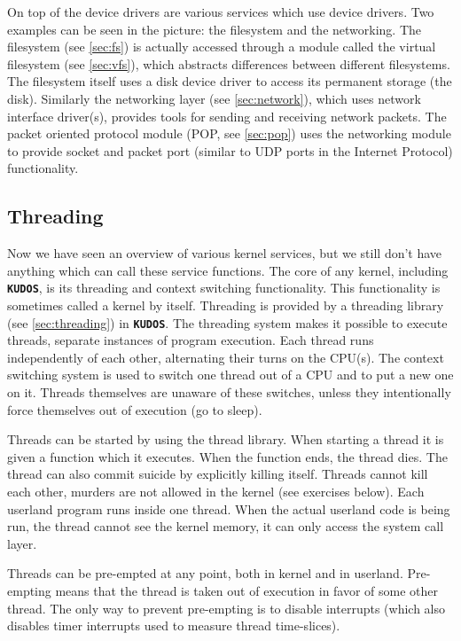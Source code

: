 \documentclass[twoside,a4paper]{report}
\newcommand{\kudos}{\texttt{\textbf{KUDOS}}}
\begin{document}
On top of the device drivers are various services which use device
drivers. Two examples can be seen in the picture: the filesystem and
the networking. The filesystem (see \autoref{sec:fs}) is actually
accessed through a module called the virtual filesystem (see
\autoref{sec:vfs}), which abstracts differences between different
filesystems. The filesystem itself uses a disk device driver to access
its permanent storage (the disk). Similarly the networking layer (see
\autoref{sec:network}), which uses network interface driver(s),
provides tools for sending and receiving network packets. The packet
oriented protocol module (POP, see \autoref{sec:pop}) uses the
networking module to provide socket and packet port (similar to UDP
ports in the Internet Protocol) functionality.

\subsection{Threading}


Now we have seen an overview of various kernel services, but we still
don't have anything which can call these service functions. The core
of any kernel, including \kudos{}, is its threading and context
switching functionality. This functionality is sometimes called a
kernel by itself. Threading is provided by a threading library (see
\autoref{sec:threading}) in \kudos{}. The threading system makes it
possible to execute threads, separate instances of program
execution. Each thread runs independently of each other, alternating
their turns on the CPU(s). The context switching system is used to
switch one thread out of a CPU and to put a new one on it. Threads
themselves are unaware of these switches, unless they intentionally
force themselves out of execution (go to sleep).

Threads can be started by using the thread library. When starting a
thread it is given a function which it executes. When the function
ends, the thread dies. The thread can also commit suicide by
explicitly killing itself. Threads cannot kill each other, murders are
not allowed in the kernel (see exercises below). Each userland program
runs inside one thread. When the actual userland code is being run,
the thread cannot see the kernel memory, it can only access the system
call layer.

Threads can be pre-empted at any point, both in kernel and in
userland. Pre-empting means that the thread is taken out of execution
in favor of some other thread. The only way to prevent pre-empting is
to disable interrupts (which also disables timer interrupts used to
measure thread time-slices).
\end{document}
